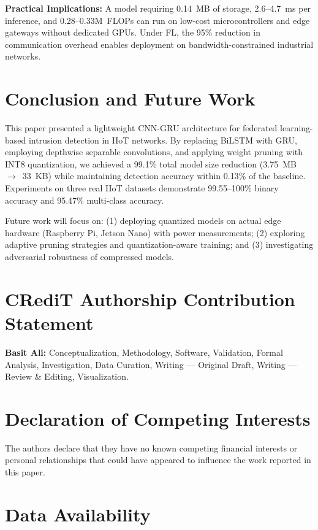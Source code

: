 \documentclass[a4paper,fleqn]{cas-sc}
\begin{document}
\textbf{Practical Implications:} A model requiring 0.14~MB of storage, 2.6--4.7~ms per inference, and 0.28--0.33M~FLOPs can run on low-cost microcontrollers and edge gateways without dedicated GPUs. Under FL, the 95\% reduction in communication overhead enables deployment on bandwidth-constrained industrial networks.

\section{Conclusion and Future Work}
\label{sec:conclusion}

This paper presented a lightweight CNN-GRU architecture for federated learning-based intrusion detection in IIoT networks. By replacing BiLSTM with GRU, employing depthwise separable convolutions, and applying weight pruning with INT8 quantization, we achieved a 99.1\% total model size reduction (3.75~MB~$\rightarrow$~33~KB) while maintaining detection accuracy within 0.13\% of the baseline. Experiments on three real IIoT datasets demonstrate 99.55--100\% binary accuracy and 95.47\% multi-class accuracy.

Future work will focus on: (1) deploying quantized models on actual edge hardware (Raspberry Pi, Jetson Nano) with power measurements; (2) exploring adaptive pruning strategies and quantization-aware training; and (3) investigating adversarial robustness of compressed models.

\section*{CRediT Authorship Contribution Statement}

\textbf{Basit Ali:} Conceptualization, Methodology, Software, Validation, Formal Analysis, Investigation, Data Curation, Writing --- Original Draft, Writing --- Review \& Editing, Visualization.

\section*{Declaration of Competing Interests}

The authors declare that they have no known competing financial interests or personal relationships that could have appeared to influence the work reported in this paper.

\section*{Data Availability}
\end{document}
